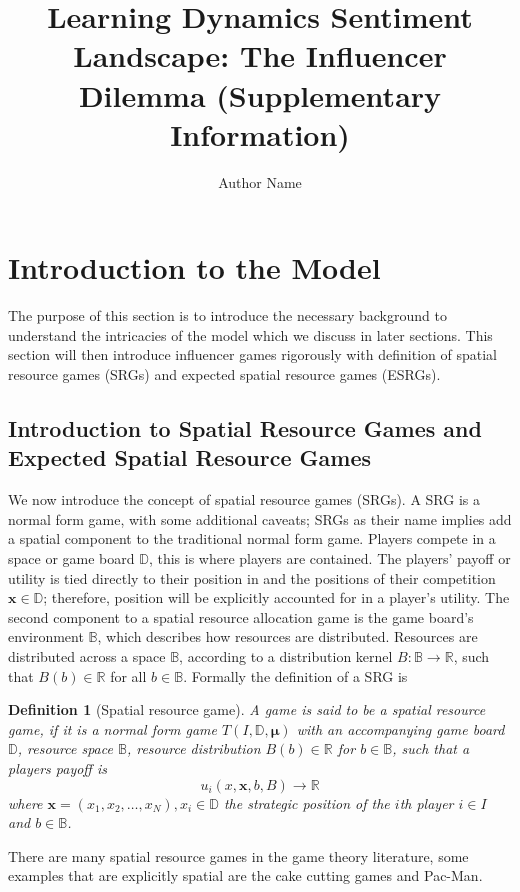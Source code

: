 \documentclass{article}
\title{Learning Dynamics Sentiment Landscape: The Influencer Dilemma (Supplementary Information) }
\author{Author Name} %
\newtheorem{definition}{Definition}
\newcommand {\R}{\mathbb{R}}
\begin{document}
\maketitle
 
\tableofcontents
    \section{Introduction to the Model}
        The purpose of this section is to introduce the necessary background to understand the intricacies of the model which we discuss in later sections. This section will then introduce influencer games rigorously with definition of spatial resource games (SRGs) and expected spatial resource games (ESRGs). 
       
        \subsection{Introduction to Spatial Resource Games and Expected Spatial Resource Games}
            We now introduce the concept of spatial resource games (SRGs). A SRG is a normal form game, with some additional caveats; SRGs as their name implies add a spatial component to the traditional normal form game. Players compete in a space or game board $\mathbb{D}$, this is where players are contained. The players' payoff or utility is tied directly to their position in and the positions of their competition $\mathbf{x}\in\mathbb{D}$; therefore, position will be explicitly accounted for in a player's utility. The second component to a spatial resource allocation game is the game board's environment $\mathbb{B}$, which describes how resources are distributed. Resources are distributed across a space $\mathbb{B}$, according to a distribution kernel $B:\mathbb{B}\to \R$, such that $B(b)\in \R$ for all $b\in \mathbb{B}$. Formally the definition of a SRG is 
            \begin{definition}[Spatial resource game]
                A game is said to be a spatial resource game, if it is a normal form game $T(I,\mathbb{D},\mathbf{\mu})$ with an accompanying game board $\mathbb{D}$, resource space $\mathbb{B}$, resource distribution $B(b)\in \R$ for $b\in \mathbb{B}$, such that a players payoff is 
                \begin{equation}
                    u_i(x,\mathbf{x},b,B)\to \mathbb{R}
                \end{equation}
                where $\mathbf{x}=(x_1,x_2,\dots,x_N), x_i\in\mathbb{D}$ the strategic position of the $i$th player $i\in I$ and $b\in\mathbb{B}$. 
            \end{definition}
            There are many spatial resource games in the game theory literature, some examples that are explicitly spatial are the cake cutting games and Pac-Man. 
\end{document}
